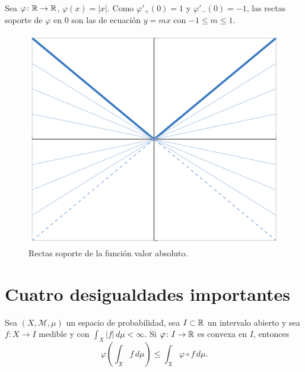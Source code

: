 \documentclass[a4paper, 11pt, oneside]{report}
\begin{document}
\begin{example}
  Sea $\varphi \colon \mathbb R \to \mathbb R$, $\varphi(x)=|x|$. Como $\varphi'_+(0)=1$ y $\varphi'_-(0)=-1$, las rectas soporte de $\varphi$ en $0$ son las de ecuación $y = mx$ con $-1 \leq m \leq 1$.

  \begin{figure}[H]
    \centering
    \includegraphics{./plot2/main.pdf}
    \caption{Rectas soporte de la función valor absoluto.}
  \end{figure}

\end{example}

\section{Cuatro desigualdades importantes}

\begin{theorem}\label{teo:1.2.1}
  Sea $(X,\mathcal{M},\mu)$ un espacio de probabilidad, sea $I \subset \mathbb R$ un intervalo abierto y sea $f \colon X \to I$ medible y con $\int_X |f| \, d\mu < \infty$. Si $\varphi \colon I \to \mathbb R$ es convexa en $I$, entonces
  \[\varphi\left(\int_X f \, d\mu\right) \leq \int_X \varphi \circ f \, d\mu.\]
\end{theorem}
\end{document}

